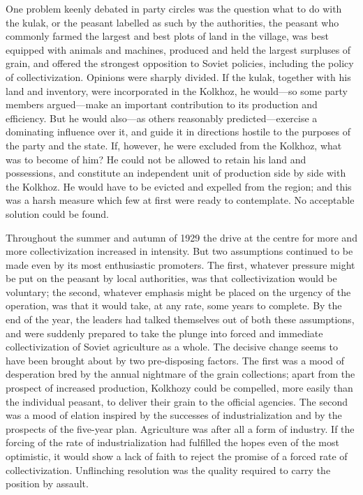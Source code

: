 One problem keenly debated in party circles was the question what to do with the kulak, or the peasant labelled as such by the authorities, the peasant who commonly farmed the largest and best plots of land in the village, was best equipped with animals and machines, produced and held the largest surpluses of grain, and offered the strongest opposition to Soviet policies, including the policy of collectivization. Opinions were sharply divided. If the kulak, together with his land and inventory, were incorporated in the Kolkhoz, he would---so some party members argued---make an important contribution to its production and efficiency. But he would also---as others reasonably predicted---exercise a dominating influence over it, and guide it in directions hostile to the purposes of the party and the state. If, however, he were excluded from the Kolkhoz, what was to become of him? He could not be allowed to retain his land and possessions, and constitute an independent unit of production side by side with the Kolkhoz. He would have to be evicted and expelled from the region; and this was a harsh measure which few at first were ready to contemplate. No acceptable solution could be found. 

Throughout the summer and autumn of 1929 the drive at the centre for more and more collectivization increased in intensity. But two assumptions continued to be made even by its most enthusiastic promoters. The first, whatever pressure might be put on the peasant by local authorities, was that collectivization would be voluntary; the second, whatever emphasis might be placed on the urgency of the operation, was that it would take, at any rate, some years to complete. By the end of the year, the leaders had talked themselves out of both these assumptions, and were suddenly prepared to take the plunge into forced and immediate collectivization of Soviet agriculture as a whole. The decisive change seems to have been brought about by two pre-disposing factors. The first was a mood of desperation bred by the annual nightmare of the grain collections; apart from the prospect of increased production, Kolkhozy could be compelled, more easily than the individual peasant, to deliver their grain to the official agencies. The second was a mood of elation inspired by the successes of industrialization and by the prospects of the five-year plan. Agriculture was after all a form of industry. If the forcing of the rate of industrialization had fulfilled the hopes even of the most optimistic, it would show a lack of faith to reject the promise of a forced rate of collectivization. Unflinching resolution was the quality required to carry the position by assault. 

